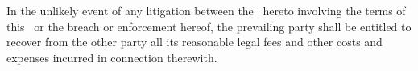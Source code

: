 In the unlikely event of any litigation between the \parties\ hereto involving the terms of this \amendmentTitle\ or the breach or enforcement hereof, the prevailing party shall be entitled to recover from the other party all its reasonable legal fees and other costs and expenses incurred in connection therewith.
